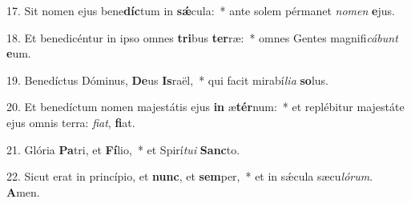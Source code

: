 17. Sit nomen ejus bene\textbf{díc}tum in \textbf{sǽ}cula:~*  ante solem pérmanet \textit{no}\textit{men} \textbf{e}jus.\

18. Et benedicéntur in ipso omnes \textbf{tri}bus \textbf{ter}ræ:~*  omnes Gentes magnifi\textit{cá}\textit{bunt} \textbf{e}um.\

19. Benedíctus Dóminus, \textbf{De}us \textbf{Is}raël,~*  qui facit mirabí\textit{li}\textit{a} \textbf{so}lus.\

20. Et benedíctum nomen majestátis ejus \textbf{in} æ\textbf{tér}num:~*  et replébitur majestáte ejus omnis terra: \textit{fi}\textit{at}, \textbf{fi}at.\

21. Glória \textbf{Pa}tri, et \textbf{Fí}lio,~*  et Spirí\textit{tu}\textit{i} \textbf{Sanc}to.\

22. Sicut erat in princípio, et \textbf{nunc}, et \textbf{sem}per,~*  et in sǽcula sæcu\textit{ló}\textit{rum}. \textbf{A}men.\

